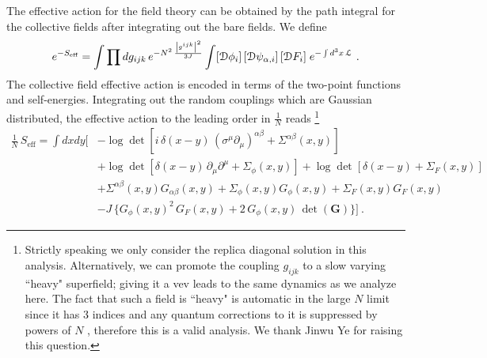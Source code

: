 \documentclass[11pt]{article}
\begin{document}
The effective action for the field theory can be obtained by the path integral for the collective fields after integrating out the bare fields. We define 
%
\begin{equation}\label{eq:SeffA}
\begin{split}
e^{-S_\text{eff}}=
	\int  \prod d g_{ijk} \,e^{-N^2\, \frac{\abs{g^{ijk}}^2}{3J}} 
	\int [\mathcal{D}\phi_i]\,[\mathcal{D}\psi_{\alpha,i}]\,[\mathcal{D}F_i] \; e^{-\int d^3 x \,\mathcal{L}}\ .
\end{split}
\end{equation}
%
The collective field effective action is encoded in terms of the two-point functions and self-energies. Integrating out the random couplings which are Gaussian distributed,  the effective action to the leading order in $\frac{1}{N}$ reads \footnote{Strictly speaking we only consider the replica diagonal solution in this analysis. Alternatively, we can promote the coupling $g_{ijk}$ to a slow varying ``heavy" superfield; giving it a vev leads to the same dynamics as we analyze here. The fact that such a field is ``heavy" is automatic in the large $N$ limit since it has 3 indices and any quantum corrections to it is suppressed by powers of $N$ \cite{Peng:2017kro}, therefore this is a valid analysis. We thank Jinwu Ye for raising this question. }
%
\begin{equation}\label{eq:SeffGS}
\begin{split}
\frac{1}{N}\, S_\text{eff} 
= \int dx dy \Bigg[
&
	-\log \det \left[ i\,\delta(x-y)\, (\sigma^\mu \partial_\mu)^{\alpha\beta}+\Sigma^{\alpha\beta}(x,y)\right] \\
&
	 + \log\det \left[\delta(x-y)\,\partial_{\mu}\partial^{\mu}  +\Sigma_\phi(x,y)\right] +\log\det \left[\delta(x-y)  +\Sigma_F(x,y) \right]\\
&
	+ \Sigma^{\alpha\beta}(x,y)G_{\alpha\beta}(x,y) +\Sigma_\phi(x,y)G_\phi (x,y)
	+\Sigma_F(x,y)G_F (x,y) \\
&
	  -
	J\, \Bigg\{ G_\phi(x,y)^2 \, G_F(x,y)+ 2\, G_\phi(x,y) \, \det(\mathbf{G})
	\Bigg\}\Bigg] \ .
\end{split}
\end{equation}
%
\end{document}
